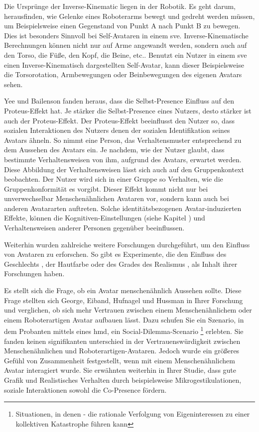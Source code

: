 \documentclass[a4paper,11pt]{article}%
\renewcommand{\\}{\vspace*{0.5\baselineskip} \newline}
\begin{document}
Die Ursprünge der Inverse-Kinematic liegen in der Robotik. Es geht darum, herausfinden, wie Gelenke eines Roboterarms bewegt und gedreht werden müssen, um Beispielsweise einen Gegenstand von Punkt A nach Punkt B zu bewegen. Dies ist besonders Sinnvoll bei Self-Avataren in einem \ac{sve}. Inverse-Kinematische Berechnungen können nicht nur auf Arme angewandt werden, sondern auch auf den Torso, die Füße, den Kopf, die Beine, etc.. Benutzt ein Nutzer in einem \ac{sve} einen Inverse-Kinematisch dargestellten Self-Avatar, kann dieser Beispielsweise die Torsorotation, Armbewegungen oder Beinbewegungen des eigenen Avatars sehen.

Yee und Bailenson fanden heraus, dass die Selbst-Presence Einfluss auf den Proteus-Effekt hat. Je stärker die Selbst-Presence eines Nutzers, desto stärker ist auch der Proteus-Effekt. Der Proteus-Effekt beeinflusst den Nutzer so, dass sozialen Interaktionen des Nutzers denen der sozialen Identifikation seines Avatars ähneln. So nimmt eine Person, das Verhaltensmuster entsprechend zu dem Aussehen des Avatars ein. Je nachdem, wie der Nutzer glaubt, dass bestimmte Verhaltensweisen von ihm, aufgrund des Avatars, erwartet werden. \citep{ratan2015leveling} 
Diese Abbildung der Verhaltensweisen lässt sich auch auf den Gruppenkontext beobachten. Der Nutzer wird sich in einer Gruppe so Verhalten, wie die Gruppenkonformität es vorgibt.
Dieser Effekt kommt nicht nur bei unverwechselbar Menschenähnlichen Avataren vor, sondern kann auch bei anderen Avatararten auftreten. Solche identitätsbezogenen Avatar-induzierten Effekte, können die \dq{}Kognitiven-Einstellungen\dq{} (siehe Kapitel \textit{}) und Verhaltensweisen anderer Personen gegenüber beeinflussen. \citep{lok2003effects}

Weiterhin wurden zahlreiche weitere Forschungen durchgeführt, um den Einfluss von Avataren zu erforschen. So gibt es Experimente, die den Einfluss des Geschlechts \cite{slater2010first}, der Hautfarbe \cite{peck2013putting} oder des Grades des Realismus \cite{roth2016avatar}, als Inhalt ihrer Forschungen haben.

Es stellt sich die Frage, ob ein Avatar menschenähnlich Aussehen sollte. Diese Frage stellten sich George, Eiband, Hufnagel und Hussman \cite{george2018trusting} in Ihrer Forschung und verglichen, ob sich mehr Vertrauen zwischen einem Menschenähnlichem oder einem Roboterartigen Avatar aufbauen lässt.
Dazu schufen Sie ein Szenario, in dem Probanten mittels eines \ac{hmd}, ein Social-Dilemma-Scenario \footnote{Situationen, in denen - die rationale Verfolgung von Eigeninteressen zu einer kollektiven Katastrophe führen kann} erlebten. Sie fanden keinen signifikanten unterschied in der Vertrauenswürdigkeit zwischen Menschenähnlichen und Roboterartigen-Avataren. Jedoch wurde ein größeres Gefühl von Zusammenheit festgestellt, wenn mit einem Menschenähnlichem Avatar interagiert wurde. \citep{kerr1983motivation}
Sie erwähnten weiterhin in Ihrer Studie, dass gute Grafik und Realistisches Verhalten durch beispielsweise Mikrogestikulationen, soziale Interaktionen sowohl die Co-Presence fördern. \citep{george2018trusting}
\end{document}
